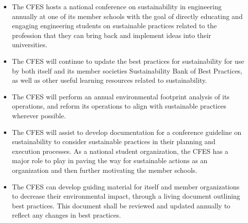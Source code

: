 \begin{itemize}
 \item The CFES hosts a national conference on sustainability in engineering annually at one of its member schools with the goal of directly educating and engaging engineering students on sustainable practices related to the profession that they can bring back and implement ideas into their universities.
 \item The CFES will continue to update the best practices for sustainability for use by both itself and its member societies Sustainability Bank of Best Practices, as well as other useful learning resources related to sustainability.
\end{itemize}

\begin{itemize}
 \item The CFES will perform an annual environmental footprint analysis of its operations, and reform its operations to align with sustainable practices wherever possible.
 \item The CFES will assist to develop documentation for a conference guideline on sustainability to consider sustainable practices in their planning and execution processes. As a national student organization, the CFES has a major role to play in paving the way for sustainable actions as an organization and then further motivating the member schools.
 \item The CFES can develop guiding material for itself and member organizations to decrease their environmental impact, through a living document outlining best practices. This document shall be reviewed and updated annually to reflect any changes in best practices.
\end{itemize}

\newpage
